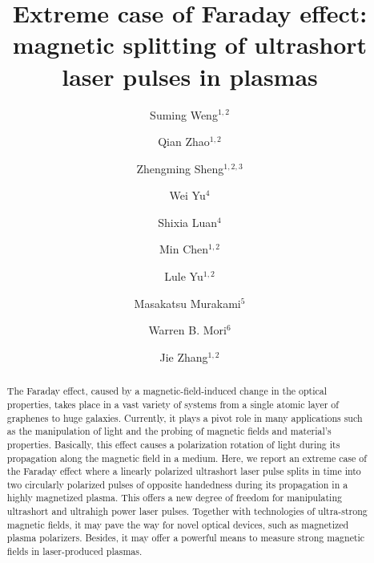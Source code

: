 \documentclass[%
aps,
preprint,
showpacs,
preprintnumbers,
 amsmath,
 amssymb,
 prl,
]{revtex4-1}
\begin{document}
\title{Extreme case of Faraday effect: magnetic splitting of ultrashort laser pulses in plasmas}

\author{Suming Weng$^{1,2}$}
\author{Qian Zhao$^{1,2}$}
\author{Zhengming Sheng$^{1,2,3}$}%
\author{Wei Yu$^{4}$}
\author{Shixia Luan$^{4}$}
\author{Min Chen$^{1,2}$}
\author{Lule Yu$^{1,2}$}
\author{Masakatsu Murakami$^{5}$}
\author{Warren B. Mori$^{6}$}
\author{Jie Zhang$^{1,2}$}

%
%
%

\begin{abstract}
The Faraday effect, caused by a magnetic-field-induced change in the optical properties, takes place in a vast variety of systems from a single atomic layer of graphenes to huge galaxies.
Currently, it plays a pivot role in many applications such as the manipulation of light and the probing of magnetic fields and material's properties.
Basically, this effect causes a polarization rotation of light during its propagation along the magnetic field in a medium.
Here, we report an extreme case of the Faraday effect where a linearly polarized ultrashort laser pulse splits in time into two circularly polarized pulses of opposite handedness during its propagation in a highly magnetized plasma.
This offers a new degree of freedom for manipulating ultrashort and ultrahigh power laser pulses.
Together with technologies of ultra-strong magnetic fields, it may pave the way for novel optical devices, such as magnetized plasma polarizers.
Besides, it may offer a powerful means to measure strong magnetic fields in laser-produced plasmas.
\end{abstract}


\end{document}
